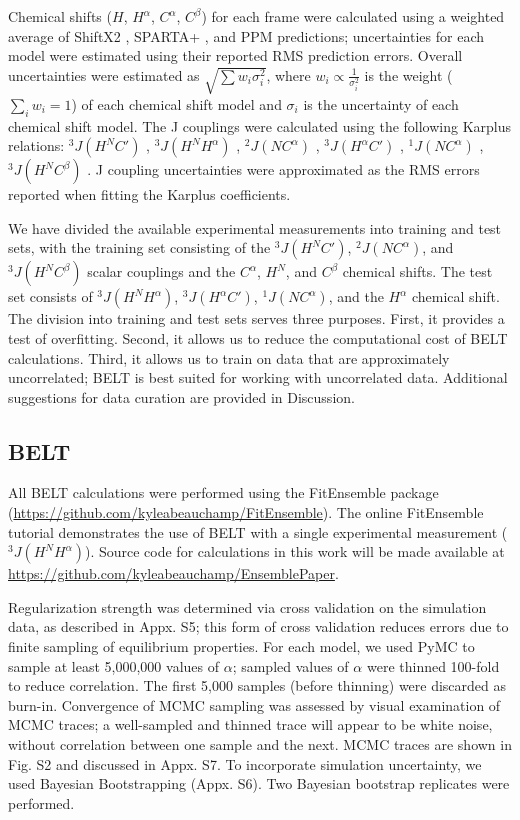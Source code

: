 \documentclass[journal=jacsat,manuscript=article]{achemso}
\begin{document}
Chemical shifts ($H$, $H^\alpha$, $C^\alpha$, $C^\beta$) for each frame were calculated using a weighted average of ShiftX2 \cite{han2011shiftx2}, SPARTA+  \cite{Shen2010}, and PPM \cite{li2012ppm} predictions; uncertainties for each model were estimated using their reported RMS prediction errors.  Overall uncertainties were estimated as $\sqrt{\sum w_i \sigma_i^2}$, where $w_i \propto \frac{1}{\sigma_i^2}$ is the weight ($\sum_i w_i = 1$) of each chemical shift model and $\sigma_i$ is the uncertainty of each chemical shift model.  The J couplings were calculated using the following Karplus relations: $^3J(H^N C')$  \cite{vogeli2007limits}, $^3J(H^N H^\alpha)$  \cite{vogeli2007limits}, $^2J(N C^\alpha)$  \cite{Graf2007}, $^3J(H^\alpha C')$  \cite{Schmidt1999}, $^1J(N C^\alpha)$  \cite{Graf2007}, $^3J(H^N C^\beta)$  \cite{vogeli2007limits}.  J coupling uncertainties were approximated as the RMS errors reported when fitting the Karplus coefficients.  

We have divided the available experimental measurements into training and test sets, with the training set consisting of the $^3J(H^N C')$,  $^2J(N C^\alpha)$, and $^3J(H^N C^\beta)$ scalar couplings and the $C^\alpha$, $H^N$, and $C^\beta$ chemical shifts.  The test set consists of $^3J(H^N H^\alpha)$, $^3J(H^\alpha C')$, $^1J(N C^\alpha)$, and the $H^\alpha$ chemical shift.  The division into training and test sets serves three purposes.  First, it provides a test of overfitting.  Second, it allows us to reduce the computational cost of BELT calculations.  Third, it allows us to train on data that are approximately uncorrelated; BELT is best suited for working with uncorrelated data.  Additional suggestions for data curation are provided in Discussion.  

\subsection*{BELT}

All BELT calculations were performed using the FitEnsemble package (\url{https://github.com/kyleabeauchamp/FitEnsemble}).  The online FitEnsemble tutorial demonstrates the use of BELT with a single experimental measurement ($^3J(H^N H^\alpha)$).  Source code for calculations in this work will be made available at \url{https://github.com/kyleabeauchamp/EnsemblePaper}.  

Regularization strength was determined via cross validation on the simulation data, as described in Appx. S5; this form of cross validation reduces errors due to finite sampling of equilibrium properties.  For each model, we used PyMC to sample at least 5,000,000 values of $\alpha$; sampled values of $\alpha$ were thinned 100-fold to reduce correlation.  The first 5,000 samples (before thinning) were discarded as burn-in.  Convergence of MCMC sampling was assessed by visual examination of MCMC traces; a well-sampled and thinned trace will appear to be white noise, without correlation between one sample and the next.  MCMC traces are shown in Fig. S2 and discussed in Appx. S7.  To incorporate simulation uncertainty, we used Bayesian Bootstrapping (Appx. S6).  Two Bayesian bootstrap replicates were performed.  
\end{document}
